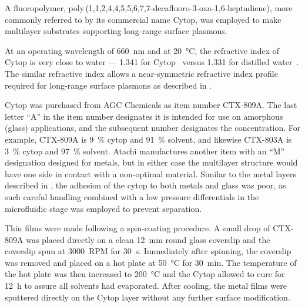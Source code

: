 A fluoropolymer, poly\,(1,1,2,4,4,5,5,6,7,7-decafluoro-3-oxa-1,6-heptadiene),
more commonly referred to by its commercial name Cytop, was employed to
make multilayer substrates supporting long-range surface plasmons.

At an operating wavelength of \SI{660}{\nano\meter} and at
\SI{20}{\celsius}, the refractive index of Cytop is very close to water ---
1.341 for Cytop~\cite{mikevs2005synthesis} versus 1.331 for distilled
water~\cite{andreasson1971measurement}.  The similar refractive index
allows a near-symmetric refractive index profile required for long-range
surface plasmons as described in .

Cytop was purchased from AGC Chemicals as item number CTX-809A\@.  The last
letter ``A'' in the item number designates it is intended for use on amorphous
(glass) applications, and the subsequent number designates the concentration.
For example, CTX-809A is \SI{9}{\percent} cytop and \SI{91}{\percent} solvent,
and likewise CTX-803A is \SI{3}{\percent} cytop and \SI{97}{\percent} solvent.
Atachi manufactures another item with an ``M'' designation designed for
metals, but in either case the multilayer structure would have one side in
contact with a non-optimal material.  Similar to the metal layers described in
, the adhesion of the cytop to both metals and
glass was poor, as such careful handling combined with a low pressure
differentials in the microfluidic stage was employed to prevent separation.

Thin films were made following a spin-coating procedure.  A small drop of
CTX-809A was placed directly on a clean \SI{12}{\milli\meter} round glass
coverslip and the coverslip spun at \SI{3000}{RPM} for \SI{30}{\second}.
Immediately after spinning, the coverslip was removed and placed on a hot
plate at \SI{50}{\celsius} for \SI{30}{\minute}.  The temperature of the hot
plate was then increased to \SI{200}{\celsius} and the Cytop allowed to cure
for \SI{12}{\hour} to assure all solvents had evaporated.  After cooling, the
metal films were sputtered directly on the Cytop layer without any further
surface modification.

